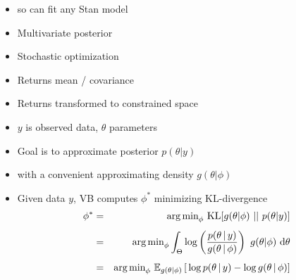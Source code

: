 \documentclass[10pt]{report}
\begin{document}
%
\begin{itemize}
%
\item {} so can fit any Stan model
%
\item Multivariate  posterior
%
\item Stochastic  optimization
%
\item Returns  mean / covariance
\item Returns  transformed to constrained space
\end{itemize}


%
\begin{itemize}
\item $y$ is observed data, $\theta$ parameters
\item Goal is to approximate posterior $p(\theta | y)$
\item with a convenient approximating density $g(\theta | \phi)$
\item Given data $y$, VB computes $\phi^*$
minimizing KL-divergence
{\small
\begin{eqnarray*}
\phi^*
& = &
\displaystyle
\mbox{arg\,min}_{\phi} \ \mbox{KL}[g(\theta|\phi) \ || \ p(\theta|y)]
\\[4pt]
& = &
\displaystyle
\mbox{arg\,min}_{\phi}
\int_{\Theta}
  \log\left(
    \frac{p(\theta \, | \, y)}{g(\theta \, | \, \phi)}
  \right)
  \ g(\theta | \phi) \ \mathrm{d}\theta
\\[4pt]
& = &
\mbox{arg\,min}_{\phi} \
\mathbb{E}_{g(\theta|\phi)}\left[\,
  \log p(\theta \, | \, y) - \log g(\theta \, | \, \phi)
\right]
\end{eqnarray*}
}
\end{itemize}
\end{document}
